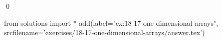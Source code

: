 
\begin{ex}
  \label{ex:18-17-one-dimensional-arrays}
  
  \qed
\end{ex}
\begin{python0}
from solutions import *
add(label="ex:18-17-one-dimensional-arrays",
    srcfilename='exercises/18-17-one-dimensional-arrays/answer.tex')
\end{python0}
